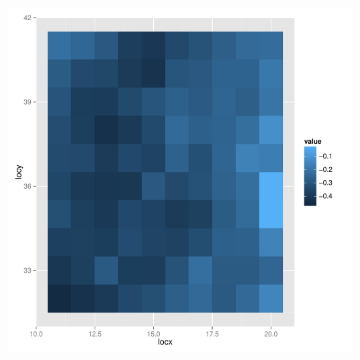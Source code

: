 \begin{figure}
\begin{subfigure}[b]{0.3\textwidth}
        \end{subfigure}
          \begin{subfigure}[b]{0.3\textwidth}
                \centering
                \includegraphics[width=\textwidth]{Images-future-work/coef2-spatial.pdf}
        \end{subfigure}
        

\end{figure}
